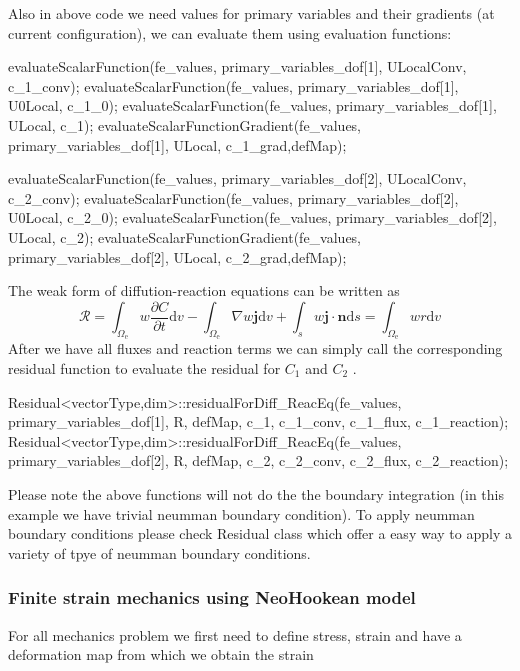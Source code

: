  Also in above code we need values for primary variables and their gradients (at current configuration), we can evaluate them using {\ttfamily evaluation} {\ttfamily functions\+:} 
\begin{DoxyCode}
evaluateScalarFunction(fe\_values, primary\_variables\_dof[1], ULocalConv, c\_1\_conv);
evaluateScalarFunction(fe\_values, primary\_variables\_dof[1], U0Local, c\_1\_0);
evaluateScalarFunction(fe\_values, primary\_variables\_dof[1], ULocal, c\_1);   
evaluateScalarFunctionGradient(fe\_values, primary\_variables\_dof[1], ULocal, c\_1\_grad,defMap);

evaluateScalarFunction(fe\_values, primary\_variables\_dof[2], ULocalConv, c\_2\_conv);
evaluateScalarFunction(fe\_values, primary\_variables\_dof[2], U0Local, c\_2\_0);
evaluateScalarFunction(fe\_values, primary\_variables\_dof[2], ULocal, c\_2);   
evaluateScalarFunctionGradient(fe\_values, primary\_variables\_dof[2], ULocal, c\_2\_grad,defMap);
\end{DoxyCode}
 The weak form of diffution-\/reaction equations can be written as \[ \mathscr{R}=\int_{\Omega_{\text{e}}}w\frac{\partial C}{\partial t}\text{d}v-\int_{\Omega_{\text{e}}} \nabla w \boldsymbol{j} \text{d}v+\int_{s}w\boldsymbol{j}\cdot\boldsymbol{n} \text{d}s=\int_{\Omega_{\text{e}}}w r \text{d}v \] After we have all fluxes and reaction terms we can simply call the corresponding residual function to evaluate the residual for $C_\text{1}$ and $C_\text{2}$ . 
\begin{DoxyCode}
Residual<vectorType,dim>::residualForDiff_ReacEq(fe\_values, primary\_variables\_dof[1], R, defMap, c\_1, 
      c\_1\_conv, c\_1\_flux, c\_1\_reaction);
Residual<vectorType,dim>::residualForDiff_ReacEq(fe\_values, primary\_variables\_dof[2], R, defMap, c\_2, 
      c\_2\_conv, c\_2\_flux, c\_2\_reaction);
\end{DoxyCode}
 Please note the above functions will not do the the boundary integration (in this example we have trivial neumman boundary condition). To apply neumman boundary conditions please check {\ttfamily Residual} class which offer a easy way to apply a variety of tpye of neumman boundary conditions. \hypertarget{_intercalation_mechanics}{}\subsubsection{Finite strain mechanics using Neo\+Hookean model}\label{_intercalation_mechanics}
For all mechanics problem we first need to define stress, strain and have a deformation map from which we obtain the strain 
